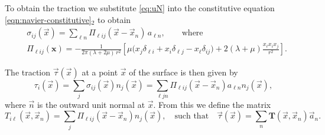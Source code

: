 \documentclass{article}
\begin{document}
To obtain the traction we substitute \eqref{eq:uN} into the constitutive equation \eqref{eqn:navier-constitutive}${}_2$ to obtain 
\begin{align}
& \sigma_{ij}(\vec x) = \sum_{\ell n} \Pi_{\ell i j}(\vec x - \vec x_n)\,a_{\ell n}, \qquad \text{where}
\\
& \Pi_{\ell i j}(\mathbf x)
= -\frac{1}{2\pi(\lambda+2\mu)\,r^2}\left[
    \mu\big(x_j\delta_{\ell i}+x_i\delta_{\ell j}-x_\ell\delta_{ij}\big)
    +2(\lambda+\mu)\frac{x_\ell x_i x_j}{r^2}
\right].
\end{align}

The traction $\vec \tau(\vec x)$ at a point $\vec x$ of the surface is then given by 
\[
\tau_i(\vec x) = \sum_{j}\sigma_{ij}(\vec x) n_j(\vec x) = \sum_{\ell j n} \Pi_{\ell  i j}(\vec x - \vec x_n) a_{\ell n} n_j(\vec x),
\]
where $\vec n$ is the outward unit normal at $\vec x$. From this we define the matrix 
\begin{equation} \label{eq:tauN}
T_{i\ell}(\vec x, \vec x_n) = \sum_{j}\Pi_{\ell i j}(\vec x - \vec x_n) n_j(\vec x), 
\quad \text{such that} \quad 
\vec \tau(\vec x) = \sum_{n} \mathbf T(\vec x, \vec x_n) \vec a_n.     
\end{equation}
\end{document}
